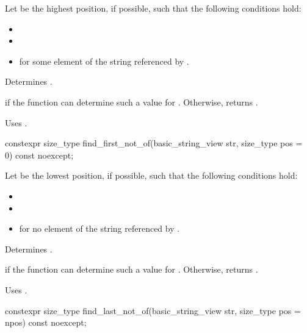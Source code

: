 \begin{itemdescr}
\pnum
Let  be the highest position, if possible, such that the following conditions hold:
\begin{itemize}
\item
{}
\item
{}
\item
{} for some element  of the string referenced by .
\end{itemize}

\pnum
\effects
Determines .

\pnum
\returns
{} if the function can determine such a value for .
Otherwise, returns .

\pnum
\remarks
Uses .
\end{itemdescr}

%
\begin{itemdecl}
constexpr size_type find_first_not_of(basic_string_view str, size_type pos = 0) const noexcept;
\end{itemdecl}

\begin{itemdescr}
\pnum
Let  be the lowest position, if possible, such that the following conditions hold:
\begin{itemize}
\item
{}
\item
{}
\item
{} for no element  of the string referenced by .
\end{itemize}

\pnum
\effects
Determines .

\pnum
\returns
{} if the function can determine such a value for . Otherwise, returns .

\pnum
\remarks
Uses .
\end{itemdescr}

%
\begin{itemdecl}
constexpr size_type find_last_not_of(basic_string_view str, size_type pos = npos) const noexcept;
\end{itemdecl}

